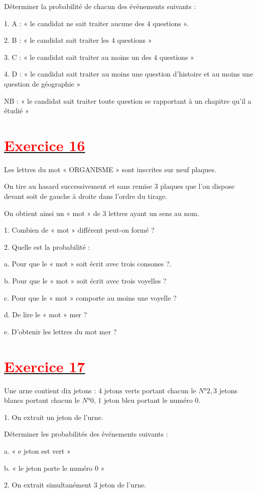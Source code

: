 \documentclass[12pt]{article}
\begin{document}
Déterminer la probabilité de chacun des événements suivants :

1. A : « le candidat ne sait traiter aucune des $4$ questions ».

2. B : « le candidat sait traiter les $4$ questions »

3. C : « le candidat sait traiter au moins un des $4$ questions »

4. D : « le candidat sait traiter au moins une question d'histoire et au moins une question de géographie »

NB : « le candidat sait traiter toute question se rapportant à un chapitre qu'il a étudié »
\section*{\underline{\textbf{\textcolor{red}{Exercice 16}}}}
Les lettres du mot « ORGANISME » sont inscrites sur neuf plaques.

On tire au hasard successivement et sans remise $3$ plaques que l'on dispose devant soit de gauche à droite dans l'ordre du tirage.

On obtient ainsi un « mot » de $3$ lettres ayant un sens au nom.

1. Combien de « mot » différent peut-on formé ?

2. Quelle est la probabilité :

a. Pour que le « mot » soit écrit avec trois consones ?.

b. Pour que le « mot » soit écrit avec trois voyelles ?

c. Pour que le « mot » comporte au moins une voyelle ?

d. De lire le « mot » mer ?

e. D'obtenir les lettres du mot mer ?
\section*{\underline{\textbf{\textcolor{red}{Exercice 17}}}}
Une urne contient dix jetons : $4$ jetons verts portant chacun le $N°2, 3$ jetons blancs portant chacun le $N°0$, $1$ jeton bleu portant le numéro $0.$

1. On extrait un jeton de l'urne. 

Déterminer les probabilités des événements suivants :

a. « e jeton est vert »

b. « le jeton porte le numéro $0$ »

2. On extrait simultanément $3$ jeton de l'urne.
\end{document}

